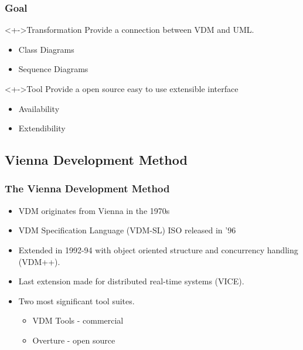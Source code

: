 %
%
\frame
{
  \frametitle{Goal}

\begin{center}

	\begin{block}<+->{Transformation}
	Provide a connection between VDM and UML. 
	\begin{itemize}
		\item Class Diagrams
		\item Sequence Diagrams
	\end{itemize}
	\end{block}
\vspace{1cm}
	\begin{block}<+->{Tool}
	Provide a open source easy to use extensible interface
	\begin{itemize}
		\item Availability
		\item Extendibility
	\end{itemize}
	\end{block}
%	  	
\end{center}
}


\subsection{Vienna Development Method}
%
%
\frame
{
  \frametitle{The Vienna Development Method}


  \begin{itemize}
  		\item<1-> VDM originates from Vienna in the 1970s
  		\item<2-> VDM Specification Language (VDM-SL) ISO released in '96
  		\item<3-> Extended in 1992-94 with object oriented structure and concurrency handling (VDM++).
  		\item<4-> Last extension made for distributed real-time systems (VICE).
  		\item<5-> Two most significant tool suites.
  		\begin{itemize}
  			\item VDM Tools - commercial
  			\item Overture - open source
  		\end{itemize}
	  	
  \end{itemize}


}

